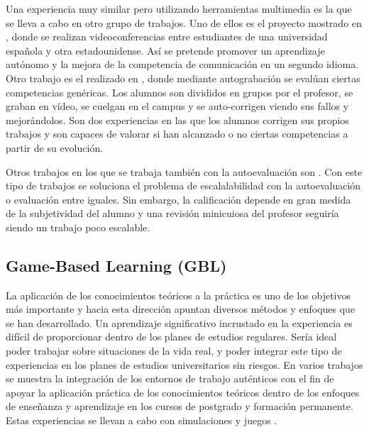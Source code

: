 Una experiencia muy similar pero utilizando herramientas multimedia es la que se lleva a cabo en otro grupo de trabajos. Uno de ellos es el proyecto mostrado en \cite{Martin-Cuadrado:2013}, donde se realizan videoconferencias entre estudiantes de una universidad española y otra estadounidense. Así se pretende promover un aprendizaje autónomo y la mejora de la competencia de comunicación en un segundo idioma. Otro trabajo es el realizado en \cite{Masip-Alvarez:2013}, donde mediante autograbación se evalúan ciertas competencias genéricas. Los alumnos son divididos en grupos por el profesor, se graban en vídeo, se cuelgan en el campus y se auto-corrigen viendo sus fallos y mejorándolos. Son dos experiencias en las que los alumnos corrigen sus propios trabajos y son capaces de valorar si han alcanzado o no ciertas competencias a partir de su evolución.

Otros trabajos en los que se trabaja también con la autoevaluación son \cite{Colomo-Palacios:2013,Liao:2013,McMahon:2007,Murdoch-Eaton:2012,Cardona:2013}. Con este tipo de trabajos se soluciona el problema de escalalabilidad con la autoevaluación o evaluación entre iguales. Sin embargo, la calificación depende en gran medida de la subjetividad del alumno y una revisión minicuiosa del profesor seguiría siendo un trabajo poco escalable. 

\subsection{Game-Based Learning (GBL)} 
La aplicación de los conocimientos teóricos a la práctica es uno de los objetivos más importante y hacia esta dirección apuntan diversos métodos y enfoques que se han desarrollado. Un aprendizaje significativo incrustado en la experiencia es difícil de proporcionar dentro de los planes de estudios regulares. Sería ideal poder trabajar sobre situaciones de la vida real, y poder integrar este tipo de experiencias en los planes de estudios universitarios sin riesgos. En varios trabajos se muestra la integración de los entornos de trabajo auténticos con el fin de apoyar la aplicación práctica de los conocimientos teóricos dentro de los enfoques de enseñanza y aprendizaje en los cursos de postgrado y formación permanente. Estas experiencias se llevan a cabo con simulaciones y juegos \cite{Petersen:2012,Borrajo:2010}.

